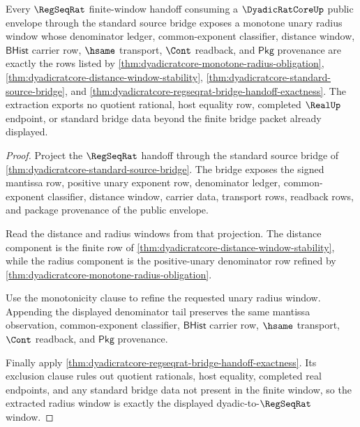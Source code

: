\begin{theorem}
\label{thm:dyadicratcore-regseqrat-radius-monotone-window-extraction}
Every $\RegSeqRat$ finite-window handoff consuming a $\DyadicRatCoreUp$ public envelope through the standard source bridge exposes a monotone unary radius window whose denominator ledger, common-exponent classifier, distance window, $\mathsf{BHist}$ carrier row, $\hsame$ transport, $\Cont$ readback, and $\mathsf{Pkg}$ provenance are exactly the rows listed by \autoref{thm:dyadicratcore-monotone-radius-obligation}, \autoref{thm:dyadicratcore-distance-window-stability}, \autoref{thm:dyadicratcore-standard-source-bridge}, and \autoref{thm:dyadicratcore-regseqrat-bridge-handoff-exactness}. The extraction exports no quotient rational, host equality row, completed $\RealUp$ endpoint, or standard bridge data beyond the finite bridge packet already displayed.
\end{theorem}
\begin{proof}
Project the $\RegSeqRat$ handoff through the standard source bridge of \autoref{thm:dyadicratcore-standard-source-bridge}. The bridge exposes the signed mantissa row, positive unary exponent row, denominator ledger, common-exponent classifier, distance window, carrier data, transport rows, readback rows, and package provenance of the public envelope.

Read the distance and radius windows from that projection. The distance component is the finite row of \autoref{thm:dyadicratcore-distance-window-stability}, while the radius component is the positive-unary denominator row refined by \autoref{thm:dyadicratcore-monotone-radius-obligation}.

Use the monotonicity clause to refine the requested unary radius window. Appending the displayed denominator tail preserves the same mantissa observation, common-exponent classifier, $\mathsf{BHist}$ carrier row, $\hsame$ transport, $\Cont$ readback, and $\mathsf{Pkg}$ provenance.

Finally apply \autoref{thm:dyadicratcore-regseqrat-bridge-handoff-exactness}. Its exclusion clause rules out quotient rationals, host equality, completed real endpoints, and any standard bridge data not present in the finite window, so the extracted radius window is exactly the displayed dyadic-to-$\RegSeqRat$ window.
\end{proof}

